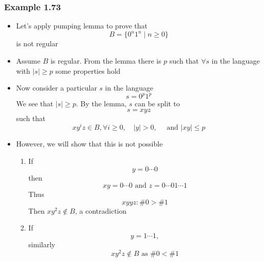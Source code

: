 




\begin{frame}[allowframebreaks] \frametitle{Example 1.73}
  \begin{itemize}
  \item Let's apply pumping lemma to prove that
    \begin{equation*}
    B=\{0^n 1^n\mid
    n \geq 0\}
  \end{equation*}
    is not regular
  \item Assume $B$ is regular. From the lemma there is
    $p$ such that \alert{$\forall s$} in the language with $|s| \geq p$ some
    properties hold
  \item Now consider \alert{a particular $s$} in the language
  \begin{equation*}
    s = 0^p 1^p
  \end{equation*}
  We see that $|s| \geq p$.
  By the lemma, $s$ can be split to 
  \begin{equation*}
s = xy z
\end{equation*}
such that
\begin{equation*}
 xy^i z \in B, \forall i \geq 0, \quad
  |y| > 0, \quad \text{ and } |xy| \leq p
\end{equation*}
\item However, we will show that this is not possible
\begin{enumerate}
\item If
  \begin{equation*}
  y=0 \cdots 0
\end{equation*}
then
\begin{equation*}
xy = 0 \cdots 0 \text{ and }
z = 0 \cdots 0 1 \cdots 1
\end{equation*}
Thus
\begin{equation*}
xyyz: \#0 > \#1
\end{equation*}
Then $xy^2 z \notin B$, a contradiction
\item If
  \begin{equation*}
y = 1 \cdots 1,
\end{equation*}
similarly
\begin{equation*}
  xy^2z \notin B \text{ as } \# 0 < \# 1
\end{equation*}


\end{enumerate}
\end{itemize}
\end{frame}
